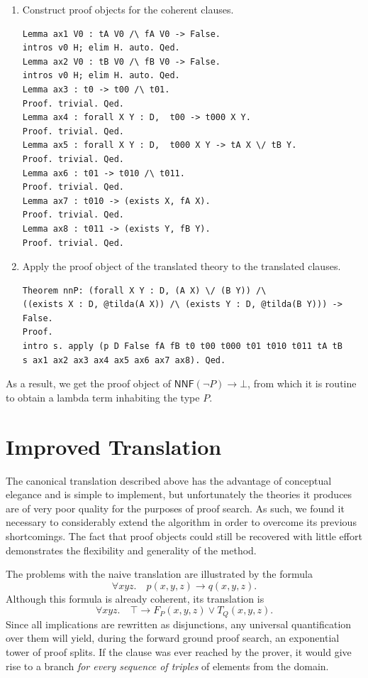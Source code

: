 \documentclass[a4paper,11pt]{article}
\newcommand{\nnf}[1]{\mathsf{NNF} #1}
\begin{document}
\begin{ex}
\begin{enumerate}
\item
Construct proof objects for the coherent clauses.
\begin{verbatim}
Lemma ax1 V0 : tA V0 /\ fA V0 -> False.
intros v0 H; elim H. auto. Qed. 
Lemma ax2 V0 : tB V0 /\ fB V0 -> False.
intros v0 H; elim H. auto. Qed. 
Lemma ax3 : t0 -> t00 /\ t01.
Proof. trivial. Qed.
Lemma ax4 : forall X Y : D,  t00 -> t000 X Y.
Proof. trivial. Qed.
Lemma ax5 : forall X Y : D,  t000 X Y -> tA X \/ tB Y.
Proof. trivial. Qed.
Lemma ax6 : t01 -> t010 /\ t011.
Proof. trivial. Qed.
Lemma ax7 : t010 -> (exists X, fA X).
Proof. trivial. Qed.
Lemma ax8 : t011 -> (exists Y, fB Y).
Proof. trivial. Qed.
\end{verbatim}
\item
Apply the proof object of the translated theory to the translated clauses.
\begin{Verbatim}[commandchars=@\{\}]
Theorem nnP: (forall X Y : D, (A X) \/ (B Y)) /\ 
((exists X : D, @tilda(A X)) /\ (exists Y : D, @tilda(B Y))) -> False.
Proof.
intro s. apply (p D False fA fB t0 t00 t000 t01 t010 t011 tA tB 
s ax1 ax2 ax3 ax4 ax5 ax6 ax7 ax8). Qed.
\end{Verbatim}
\end{enumerate}
As a result, we get the proof object of $\nnf (\lnot P) \to \bot$, from which 
it is routine to obtain a lambda term inhabiting the type $P$.
\end{ex}
\newpage
\section{Improved Translation}

The canonical translation described above has the advantage of conceptual elegance
and is simple to implement, but unfortunately the theories it produces are of
very poor quality for the purposes of proof search.  As such, we found it
necessary to considerably extend the algorithm in order to overcome its
previous shortcomings.  The fact that proof objects could still be recovered 
with little effort demonstrates the flexibility and generality of the method.

The problems with the naive translation are illustrated by the formula
\begin{equation*}
\forall x y z.\quad p(x,y,z) \to q(x,y,z).
\end{equation*}
Although this formula is already coherent, its translation is
\begin{equation*}
\forall x y z. \quad \top \to F_P(x,y,z) \lor T_Q(x,y,z).
\end{equation*}
Since all implications are rewritten as 
disjunctions, any universal
quantification over them will yield, during the forward ground proof search,
an exponential tower of proof splits.  If the clause was ever reached by the 
prover, it would give rise to a branch
\emph{for every sequence of triples} of elements from the domain.
\end{document}
